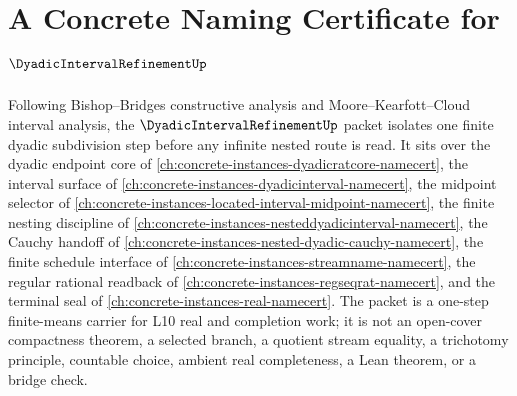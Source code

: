 \chapter{A Concrete Naming Certificate for $\DyadicIntervalRefinementUp$}
\label{ch:concrete-instances-dyadic-interval-refinement-namecert}

Following Bishop--Bridges constructive analysis and Moore--Kearfott--Cloud interval analysis, the $\DyadicIntervalRefinementUp$ packet isolates one finite dyadic subdivision step before any infinite nested route is read. It sits over the dyadic endpoint core of \autoref{ch:concrete-instances-dyadicratcore-namecert}, the interval surface of \autoref{ch:concrete-instances-dyadicinterval-namecert}, the midpoint selector of \autoref{ch:concrete-instances-located-interval-midpoint-namecert}, the finite nesting discipline of \autoref{ch:concrete-instances-nesteddyadicinterval-namecert}, the Cauchy handoff of \autoref{ch:concrete-instances-nested-dyadic-cauchy-namecert}, the finite schedule interface of \autoref{ch:concrete-instances-streamname-namecert}, the regular rational readback of \autoref{ch:concrete-instances-regseqrat-namecert}, and the terminal seal of \autoref{ch:concrete-instances-real-namecert}. The packet is a one-step finite-means carrier for L10 real and completion work; it is not an open-cover compactness theorem, a selected branch, a quotient stream equality, a trichotomy principle, countable choice, ambient real completeness, a Lean theorem, or a bridge check.

